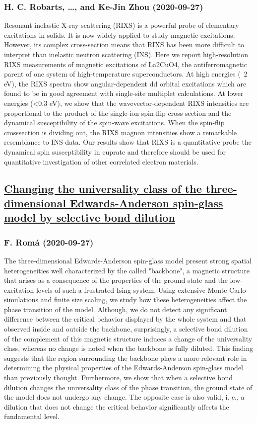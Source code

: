 \subsubsection*{H. C. Robarts, \dots, and Ke-Jin Zhou (2020-09-27)}
Resonant inelastic X-ray scattering (RIXS) is a powerful probe of elementary
excitations in solids. It is now widely applied to study magnetic excitations.
However, its complex cross-section means that RIXS has been more difficult to
interpret than inelastic neutron scattering (INS). Here we report
high-resolution RIXS measurements of magnetic excitations of La2CuO4, the
antiferromagnetic parent of one system of high-temperature superconductors. At
high energies (~2 eV), the RIXS spectra show angular-dependent dd orbital
excitations which are found to be in good agreement with single-site multiplet
calculations. At lower energies (<0.3 eV), we show that the
wavevector-dependent RIXS intensities are proportional to the product of the
single-ion spin-flip cross section and the dynamical susceptibility of the
spin-wave excitations. When the spin-flip crosssection is dividing out, the
RIXS magnon intensities show a remarkable resemblance to INS data. Our results
show that RIXS is a quantitative probe the dynamical spin susceptibility in
cuprate and therefore should be used for quantitative investigation of other
correlated electron materials.

\subsection*{\href{http://arxiv.org/abs/2009.12917v1}{Changing the universality class of the three-dimensional  Edwards-Anderson spin-glass model by selective bond dilution}}
\subsubsection*{F. Romá (2020-09-27)}
The three-dimensional Edwards-Anderson spin-glass model present strong
spatial heterogeneities well characterized by the called "backbone", a magnetic
structure that arises as a consequence of the properties of the ground state
and the low-excitation levels of such a frustrated Ising system. Using
extensive Monte Carlo simulations and finite size scaling, we study how these
heterogeneities affect the phase transition of the model. Although, we do not
detect any significant difference between the critical behavior displayed by
the whole system and that observed inside and outside the backbone,
surprisingly, a selective bond dilution of the complement of this magnetic
structure induces a change of the universality class, whereas no change is
noted when the backbone is fully diluted. This finding suggests that the region
surrounding the backbone plays a more relevant role in determining the physical
properties of the Edwards-Anderson spin-glass model than previously thought.
Furthermore, we show that when a selective bond dilution changes the
universality class of the phase transition, the ground state of the model does
not undergo any change. The opposite case is also valid, i. e., a dilution that
does not change the critical behavior significantly affects the fundamental
level.

